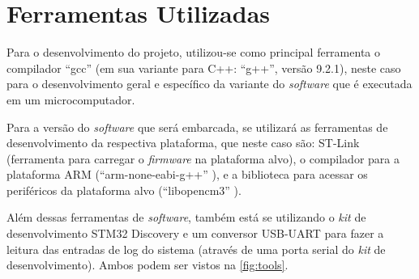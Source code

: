 %
%
%
%
%

%
%
%
%
%

\section{Ferramentas Utilizadas} \label{sec:tools}

Para o desenvolvimento do projeto, utilizou-se como principal ferramenta o compilador ``gcc'' \cite{gcc} (em sua variante para C++: ``g++'', versão 9.2.1), neste caso para o desenvolvimento geral e específico da variante do \textit{software} que é executada em um microcomputador.

Para a versão do \textit{software} que será embarcada, se utilizará as ferramentas de desenvolvimento da respectiva plataforma, que neste caso são: ST-Link \cite{stlink} (ferramenta para carregar o \textit{firmware} na plataforma alvo), o compilador para a plataforma ARM (``arm-none-eabi-g++'' \cite{gcc_arm}), e a biblioteca para acessar os periféricos da plataforma alvo (``libopencm3'' \cite{libopencm3}).

Além dessas ferramentas de \textit{software}, também está se utilizando o \textit{kit} de desenvolvimento STM32 Discovery \cite{stm32_discovery} e um conversor USB-UART para fazer a leitura das entradas de log do sistema (através de uma porta serial do \textit{kit} de desenvolvimento). Ambos podem ser vistos na \autoref{fig:tools}.

